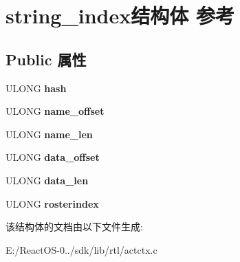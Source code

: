 \hypertarget{structstring__index}{}\section{string\+\_\+index结构体 参考}
\label{structstring__index}
\subsection*{Public 属性}
\begin{DoxyCompactItemize}
\item 
\mbox{\label{structstring__index_a33f55ee9f1bf8c4fb66e12cb36a46ab9}} 
U\+L\+O\+NG {\bfseries hash}
\item 
\mbox{\label{structstring__index_a664ece57e3e1526a665359ec0a2de86c}} 
U\+L\+O\+NG {\bfseries name\+\_\+offset}
\item 
\mbox{\label{structstring__index_a0ca8d8391d0c7a75b2860cce06e16744}} 
U\+L\+O\+NG {\bfseries name\+\_\+len}
\item 
\mbox{\label{structstring__index_a042ee3731880406f2b5fc318ea32d52a}} 
U\+L\+O\+NG {\bfseries data\+\_\+offset}
\item 
\mbox{\label{structstring__index_abe42c745e725cf1256d2e6c462c6b75c}} 
U\+L\+O\+NG {\bfseries data\+\_\+len}
\item 
\mbox{\label{structstring__index_ac6897fc0989b044df2cf7f7c4731d717}} 
U\+L\+O\+NG {\bfseries rosterindex}
\end{DoxyCompactItemize}


该结构体的文档由以下文件生成\+:\begin{DoxyCompactItemize}
\item 
E\+:/\+React\+O\+S-\/0../sdk/lib/rtl/actctx.\+c\end{DoxyCompactItemize}
